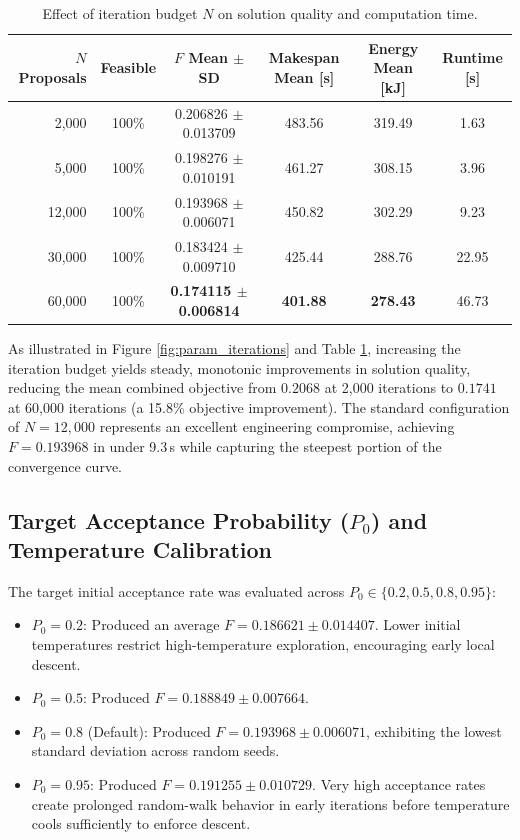 \begin{table}[htbp]
\centering
\small
\caption{Effect of iteration budget $N$ on solution quality and computation time.}
\label{tab:param_iterations}
\begin{tabular}{rccccc}
\toprule
$N$ Proposals & Feasible & $F$ Mean $\pm$ SD & Makespan Mean [s] & Energy Mean [kJ] & Runtime [s] \\
\midrule
2,000 & 100\% & 0.206826 $\pm$ 0.013709 & 483.56 & 319.49 & 1.63 \\
5,000 & 100\% & 0.198276 $\pm$ 0.010191 & 461.27 & 308.15 & 3.96 \\
12,000 & 100\% & 0.193968 $\pm$ 0.006071 & 450.82 & 302.29 & 9.23 \\
30,000 & 100\% & 0.183424 $\pm$ 0.009710 & 425.44 & 288.76 & 22.95 \\
60,000 & 100\% & \textbf{0.174115 $\pm$ 0.006814} & \textbf{401.88} & \textbf{278.43} & 46.73 \\
\bottomrule
\end{tabular}
\end{table}

As illustrated in Figure \ref{fig:param_iterations} and Table \ref{tab:param_iterations}, increasing the iteration budget yields steady, monotonic improvements in solution quality, reducing the mean combined objective from $0.2068$ at 2,000 iterations to $0.1741$ at 60,000 iterations (a 15.8\% objective improvement). The standard configuration of $N = 12,000$ represents an excellent engineering compromise, achieving $F = 0.193968$ in under 9.3\,s while capturing the steepest portion of the convergence curve.

\subsection{Target Acceptance Probability \texorpdfstring{($P_0$)}{(P0)} and Temperature Calibration}
The target initial acceptance rate was evaluated across $P_0 \in \{0.2, 0.5, 0.8, 0.95\}$:
\begin{itemize}
    \item $P_0 = 0.2$: Produced an average $F = 0.186621 \pm 0.014407$. Lower initial temperatures restrict high-temperature exploration, encouraging early local descent.
    \item $P_0 = 0.5$: Produced $F = 0.188849 \pm 0.007664$.
    \item $P_0 = 0.8$ (Default): Produced $F = 0.193968 \pm 0.006071$, exhibiting the lowest standard deviation across random seeds.
    \item $P_0 = 0.95$: Produced $F = 0.191255 \pm 0.010729$. Very high acceptance rates create prolonged random-walk behavior in early iterations before temperature cools sufficiently to enforce descent.
\end{itemize}

